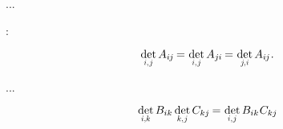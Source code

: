 \begin{otherlanguage}{russian}
...

 :

\nopagebreak\vspace{-0.25em}\begin{equation*}
\underset{\raisebox{.15em}{\scalebox{.7}{$i$,$\hspace{.15ex}j$}}}{\operatorname{det}} \, A_{i\hspace{-0.1ex}j} \hspace{-0.16ex}
= \hspace{.1ex} \underset{\raisebox{.15em}{\scalebox{.7}{$i$,$\hspace{.15ex}j$}}}{\operatorname{det}} \, A_{j\hspace{-0.06ex}i} \hspace{-0.16ex}
= \hspace{.1ex} \underset{\raisebox{.15em}{\scalebox{.7}{$j\hspace{-0.2ex}$,$\hspace{.1ex}i$}}}{\operatorname{det}} \, A_{i\hspace{-0.1ex}j}
\hspace{.1ex} .
\end{equation*}

...


\nopagebreak\vspace{-0.2em}\begin{equation}\label{determinantofmatrixproduct}
\underset{\raisebox{.15em}{\scalebox{.7}{$i$,$k$}}}{\operatorname{det}} \, B_{ik} \hspace{.4ex} \underset{\raisebox{.15em}{\scalebox{.7}{$k$,$\hspace{.15ex}j$}}}{\operatorname{det}} \, C_{kj} \hspace{-0.15ex}
= \hspace{.1ex} \underset{\raisebox{.15em}{\scalebox{.7}{$i$,$\hspace{.15ex}j$}}}{\operatorname{det}} \, B_{ik} \hspace{.1ex} C_{kj}
\end{equation}


\end{otherlanguage}
